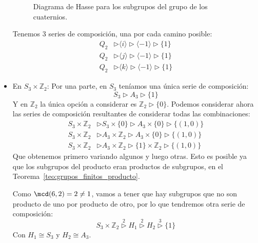 \begin{ejemplo}
\begin{itemize}
\begin{figure}[H]
                \caption{Diagrama de Hasse para los subgrupos del grupo de los cuaternios.}
            \end{figure}
            Tenemos 3 series de composición, una por cada camino posible:
            \begin{align*}
                Q_2 &\rhd \langle i \rangle  \rhd \langle -1 \rangle  \rhd \{1\} \\
                Q_2 &\rhd \langle j \rangle  \rhd \langle -1 \rangle  \rhd \{1\} \\
                Q_2 &\rhd \langle k \rangle  \rhd \langle -1 \rangle  \rhd \{1\} 
            \end{align*}
        \item En $S_3\times \mathbb{Z}_2$:
            Por una parte, en $S_3$ teníamos una única serie de composición:
            \begin{equation*}
                S_3 \rhd A_3 \rhd \{1\}
            \end{equation*}
            Y en $\mathbb{Z}_2$ la única opción a considerar es $\mathbb{Z}_2 \rhd \{0\}$.
            Podemos considerar ahora las series de composición resultantes de considerar todas las combinaciones:
            \begin{align*}
                S_3\times \mathbb{Z}_2 &\rhd S_3 \times \{0\} \rhd A_3\times \{0\} \rhd \{(1,0)\} \\
                S_3\times \mathbb{Z}_2 &\rhd A_3\times \mathbb{Z}_2 \rhd A_3 \times \{0\} \rhd \{(1,0)\} \\
                S_3\times \mathbb{Z}_2 &\rhd A_3\times \mathbb{Z}_2 \rhd \{1\}\times \mathbb{Z}_2 \rhd \{(1,0)\}
            \end{align*}
            Que obtenemos primero variando algunos y luego otras. Esto es posible ya que los subgrupos del producto eran productos de subgrupos, en el Teorema~\ref{teo:grupos_finitos_producto}.

            Como $\mcd(6,2) = 2 \neq 1$, vamos a tener que hay subgrupos que no son producto de uno por producto de otro, por lo que tendremos otra serie de composición:
            \begin{equation*}
                S_3\times \mathbb{Z}_2 \stackrel{2}{\rhd} H_1 \stackrel{2}{\rhd} H_2 \stackrel{3}{\rhd} \{1\}
            \end{equation*}
            Con $H_1\cong S_3$ y $H_2 \cong A_3$.
    \end{itemize}
\end{ejemplo}

